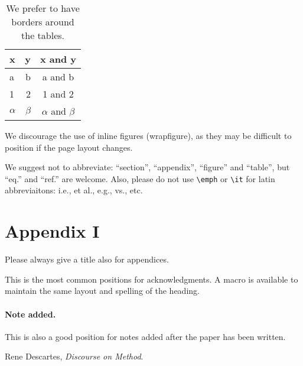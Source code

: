 \documentclass[a4paper,11pt]{article}
\theoremstyle{definition}
\begin{document}
\begin{table}[tbp]
\centering
\begin{tabular}{|lr|c|}
\hline
x&y&x and y\\
\hline 
a & b & a and b\\
1 & 2 & 1 and 2\\
$\alpha$ & $\beta$ & $\alpha$ and $\beta$\\
\hline
\end{tabular}
\caption{\label{tab:i} We prefer to have borders around the tables.}
\end{table}

We discourage the use of inline figures (wrapfigure), as they may be
difficult to position if the page layout changes.

We suggest not to abbreviate: ``section'', ``appendix'', ``figure''
and ``table'', but ``eq.'' and ``ref.'' are welcome. Also, please do
not use \texttt{\textbackslash emph} or \texttt{\textbackslash it} for
latin abbreviaitons: i.e., et al., e.g., vs., etc.

\appendix
\section{Appendix I}
Please always give a title also for appendices.



\acknowledgments

This is the most common positions for acknowledgments. A macro is
available to maintain the same layout and spelling of the heading.

\paragraph{Note added.} This is also a good position for notes added
after the paper has been written.







\fi

\begin{thebibliography}{99}

Rene Descartes, \emph{Discourse on Method}.

\end{thebibliography}
\end{document}
